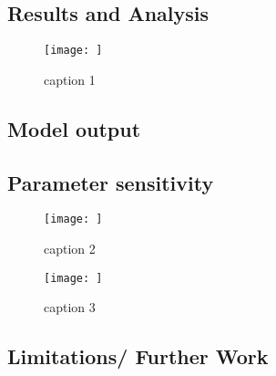 \documentclass[12pt]{article}
\begin{document}
\begin{multicols}{2}
\section{Results and Analysis}
\begin{figure*}
	\centering
	\texttt{[image: ]}
	\caption[Fig 1.]{caption 1}
	\label{Fig 1.}
\end{figure*}

\subsection{Model output}
\lipsum[6]

\subsection{Parameter sensitivity}
\lipsum[7]

\begin{figure}
	\centering
	\texttt{[image: ]}
	\caption[Fig 2]{caption 2}
	\label{Fig 3}
\end{figure}

\begin{figure}
	\centering
	\texttt{[image: ]}
	\caption[Fig 3]{caption 3}
	\label{Fig 4}
\end{figure}


\subsection{Limitations/ Further Work}
\lipsum[8]
\end{multicols}
\end{document}
